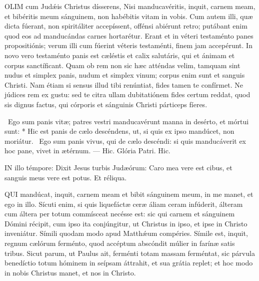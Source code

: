
\lettrine[lines=2]{O}{LIM} cum Judǽis Christus dísserens, Nisi manducavéritis, inquit, carnem meam, et bibéritis meum sánguinem, non habébitis vitam in vobis. Cum autem illi, quæ dicta fúerant, non spiritáliter accepíssent, offénsi abiérunt retro; putábant enim quod eos ad manducándas carnes hortarétur. Erant et in véteri testaménto panes propositiónis; verum illi cum fúerint véteris testaménti, finem jam accepérunt. In novo vero testaménto panis est cæléstis et calix salutáris, qui et ánimam et corpus sanctíficant. Quam ob rem non sic hæc atténdas velim, tamquam sint nudus et simplex panis, nudum et simplex vinum; corpus enim sunt et sanguis Christi. Nam étiam si sensus illud tibi renúntiat, fides tamen te confírmet. Ne júdices rem ex gustu: sed te citra ullam dubitatiónem fides certum reddat, quod sis dignus factus, qui córporis et sánguinis Christi párticeps fíeres.

\R\ Ego sum panis vitæ; patres vestri manducavérunt manna in desérto, et mórtui sunt: * Hic est panis de cælo descéndens, ut, si quis ex ipso mandúcet, non moriátur. \V\ Ego sum panis vivus, qui de cælo descéndi: si quis manducáverit ex hoc pane, vivet in ætérnum. --- Hic. Glória Patri. Hic.




\lettrine[lines=2]{I}{N} illo témpore: Dixit Jesus turbis Judæórum: Caro mea vere est cibus, et sanguis meus vere est potus. Et réliqua.



\lettrine[lines=2]{Q}{UI} mandúcat, inquit, carnem meam et bibit sánguinem meum, in me manet, et ego in illo. Sícuti enim, si quis liquefáctæ ceræ áliam ceram infúderit, álteram cum áltera per totum commísceat necésse est: sic qui carnem et sánguinem Dómini récipit, cum ipso ita conjúngitur, ut Christus in ipso, et ipse in Christo inveniátur. Símili quodam modo apud Matthǽum compéries. Símile est, inquit, regnum cælórum ferménto, quod accéptum abscóndit múlier in farínæ satis tribus. Sicut parum, ut Paulus ait, ferménti totam massam ferméntat, sic párvula benedíctio totum hóminem in seípsam áttrahit, et sua grátia replet; et hoc modo in nobis Christus manet, et nos in Christo.

